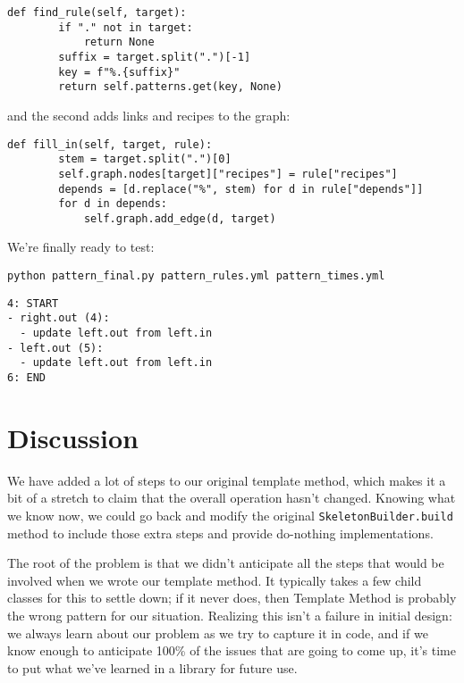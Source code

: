 \documentclass{scrbook}
\begin{document}
\begin{lstlisting}[frame=single,frameround=tttt]
    def find_rule(self, target):
        if "." not in target:
            return None
        suffix = target.split(".")[-1]
        key = f"%.{suffix}"
        return self.patterns.get(key, None)
\end{lstlisting}



\noindent and the second adds links and recipes to the graph:


\begin{lstlisting}[frame=single,frameround=tttt]
    def fill_in(self, target, rule):
        stem = target.split(".")[0]
        self.graph.nodes[target]["recipes"] = rule["recipes"]
        depends = [d.replace("%", stem) for d in rule["depends"]]
        for d in depends:
            self.graph.add_edge(d, target)
\end{lstlisting}



We're finally ready to test:


\begin{lstlisting}[frame=single,frameround=tttt]
python pattern_final.py pattern_rules.yml pattern_times.yml
\end{lstlisting}



\begin{lstlisting}[frame=single,frameround=tttt]
4: START
- right.out (4):
  - update left.out from left.in
- left.out (5):
  - update left.out from left.in
6: END
\end{lstlisting}


\section{Discussion}\label{builder-discuss}


We have added a lot of steps to our original template method,
which makes it a bit of a stretch to claim that the overall operation hasn't changed.
Knowing what we know now,
we could go back and modify the original \texttt{SkeletonBuilder.build} method
to include those extra steps and provide do-nothing implementations.


The root of the problem is that we didn't anticipate all the steps that would be involved
when we wrote our template method.
It typically takes a few child classes for this to settle down;
if it never does,
then Template Method is probably the wrong pattern for our situation.
Realizing this isn't a failure in initial design:
we always learn about our problem as we try to capture it in code,
and if we know enough to anticipate 100\% of the issues that are going to come up,
it's time to put what we've learned in a library for future use.
\end{document}
